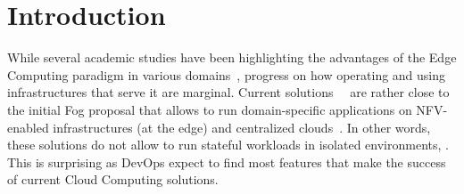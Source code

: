 \section{Introduction}
\label{sec:intro}



While several academic studies have been highlighting the advantages
of the Edge Computing paradigm in various
domains~\cite{bonomi2012fog,satyanarayanan2017emergence,shi2016edge,yi2015fog,zhang2015cloud},
progress on how operating and using infrastructures that serve it are marginal.
Current solutions~\cite{akamai:cloudlets}~\cite{amazon:lambda-edge} are rather close to the
initial Fog proposal that allows to run domain-specific applications
on  NFV-enabled infrastructures (at the edge) and
centralized clouds~\cite{bonomi2012fog}.  In other words, %
these solutions do not allow to run stateful
workloads in isolated environments, .
%
This is surprising as DevOps expect to find most features that make the success of
current Cloud Computing solutions.




